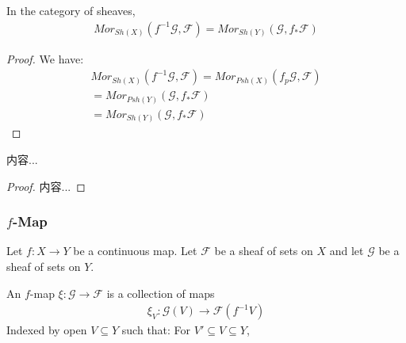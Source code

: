 \documentclass[Total.tex]{subfiles}
\begin{document}
				\begin{lemma}
					In the category of sheaves,
					\begin{gather*}
						Mor_{Sh(X)}(f^{-1}\mathcal{G},\mathcal{F})=Mor_{Sh(Y)}(\mathcal{G},f_*\mathcal{F})
					\end{gather*}
				\end{lemma}
				\begin{proof}
					We have:
					\begin{gather*}
						Mor_{Sh(X)}(f^{-1}\mathcal{G},\mathcal{F})=Mor_{Psh(X)}(f_p\mathcal{G},\mathcal{F})\\
						=Mor_{Psh(Y)}(\mathcal{G},f_*\mathcal{F})\\
						=Mor_{Sh(Y)}(\mathcal{G},f_*\mathcal{F})
					\end{gather*}
				\end{proof}
				\begin{lemma}
					内容...
				\end{lemma}
				\begin{proof}
					内容...
				\end{proof}
				\subsubsection{$f$-Map}
					\begin{Def}
						Let $f:X\rightarrow Y$ be a continuous map. Let $\mathcal{F}$ be a sheaf of sets on $X$ and let $\mathcal{G}$ be a sheaf of sets on $Y$. 
						
						An $f$-map $\xi:\mathcal{G}\rightarrow \mathcal{F}$ is a collection of maps
						\begin{gather*}
							\xi_V:\mathcal{G}(V)\rightarrow \mathcal{F}(f^{-1}V)
						\end{gather*}
						Indexed by open $V\subseteq Y$ such that: For $V'\subseteq V\subseteq Y$,
						
						\begin{center}
						\end{center}
					\end{Def}
					
\end{document}
